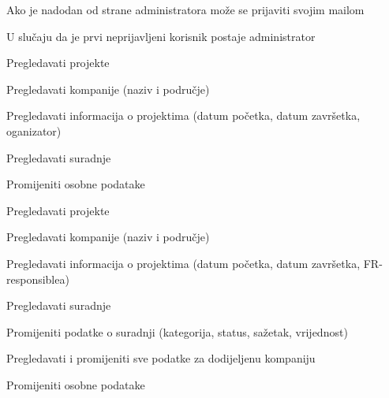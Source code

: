 			
			\begin{packed_enum}
				\item  {} 

				\begin{packed_enum}

					\item Ako je nadodan od strane administratora može se prijaviti svojim mailom
					\item U slučaju da je prvi neprijavljeni korisnik postaje administrator

				\end{packed_enum}

				\item  {} 
				
				\begin{packed_enum}
					
					\item Pregledavati projekte
					\item Pregledavati kompanije (naziv i područje)
					\item Pregledavati informacija o projektima (datum početka, datum završetka, oganizator)
					\item Pregledavati suradnje
					\item Promijeniti osobne podatake
					
				\end{packed_enum}

				\item  {} 

				\begin{packed_enum}

					\item Pregledavati projekte
					\item Pregledavati kompanije (naziv i područje)
					\item Pregledavati informacija o projektima (datum početka, datum završetka, FR-responsiblea)
					\item Pregledavati suradnje
					\item Promijeniti podatke o suradnji (kategorija, status, sažetak, vrijednost)
					\item Pregledavati i promijeniti sve podatke za dodijeljenu kompaniju
					\item Promijeniti osobne podatake


\end{packed_enum}
\end{packed_enum}
